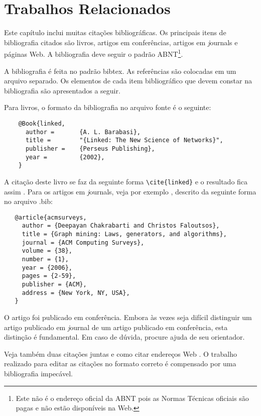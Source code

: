 %
%

\chapter{Trabalhos Relacionados}

Este capítulo inclui muitas citações bibliográficas. Os principais
itens de bibliografia citados são livros, artigos em conferências,
artigos em {\textit journals} e páginas Web. A bibliografia deve seguir o
padrão ABNT\footnote{Este não é o endereço oficial da
ABNT pois as Normas Técnicas oficiais são pagas e não estão disponíveis na Web.}.

A bibliografia é feita no padrão {\ttfamily bibtex}.  As referências são
colocadas em um arquivo separado. Os elementos de
cada item bibliográfico que devem constar na bibliografia são
apresentados a seguir.

Para livros, o formato da bibliografia no arquivo fonte é o seguinte:

\begin{verbatim}
    @Book{linked,
      author =       {A. L. Barabasi},
      title =        "{Linked: The New Science of Networks}",
      publisher =    {Perseus Publishing},
      year =         {2002},
    }
\end{verbatim}

A citação deste livro se faz da seguinte forma \verb#\cite{linked}# e o resultado fica assim \cite{linked}.
Para os artigos em {\textit journals}, veja por exemplo \cite{acmsurveys},
descrito da seguinte forma no arquivo {\ttfamily .bib}:

\begin{verbatim}
   @article{acmsurveys,
     author = {Deepayan Chakrabarti and Christos Faloutsos},
     title = {Graph mining: Laws, generators, and algorithms},
     journal = {ACM Computing Surveys},
     volume = {38},
     number = {1},
     year = {2006},
     pages = {2-59},
     publisher = {ACM},
     address = {New York, NY, USA},
   }
\end{verbatim}

O artigo \cite{3faloutsos} foi publicado em conferência.  Embora
às vezes seja difícil distinguir um artigo publicado em {\textit
  journal} de um artigo publicado em conferência, esta distinção é
fundamental.  Em caso de dúvida, procure ajuda de seu orientador.

Veja também duas citações juntas \cite{rp99,mar00}  e como citar
endereços Web \cite{irl:06}. 
O trabalho realizado para editar as citações no formato correto é
compensado por uma bibliografia impecável.

